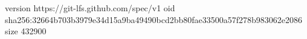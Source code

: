 version https://git-lfs.github.com/spec/v1
oid sha256:32664b703b3979e34d15a9ba49490bcd2bb80fae33500a57f278b983062e2086
size 432900
